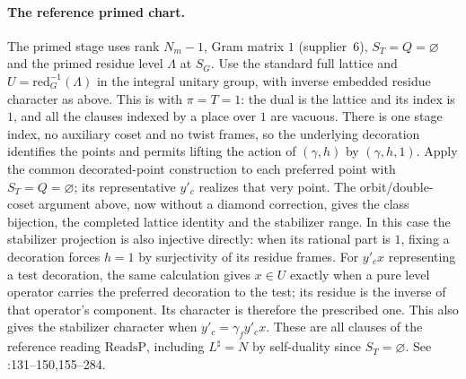 \paragraph{The reference primed chart.}
The primed stage uses rank $N_m-1$, Gram matrix $1$ (supplier~6),
$S_T=Q=\varnothing$ and the primed residue level $\Lambda$ at $S_G$.
Use the standard full lattice and $U=\mathrm{red}_G^{-1}(\Lambda)$ in
the integral unitary group, with inverse embedded residue character as
above. This is  with $\pi=T=1$: the dual is the lattice
and its index is $1$, and all the clauses indexed by a place over $1$
are vacuous. There is one stage index, no auxiliary coset and no twist
frames, so the underlying decoration identifies the points and permits
lifting the action of $(\gamma,h)$ by $(\gamma,h,1)$. Apply the common
decorated-point construction to each preferred point with $S_T=Q=\varnothing$;
its representative $y'_c$ realizes that very point. The orbit/double-coset
argument above, now without a diamond correction, gives the class bijection,
the completed lattice identity and the stabilizer range. In this case
the stabilizer projection is also injective directly: when its rational
part is $1$, fixing a decoration forces $h=1$ by surjectivity of its
residue frames. For $y'_c x$ representing a test decoration, the same
calculation gives $x\in U$ exactly when a pure level operator carries
the preferred decoration to the test; its residue is the inverse of that
operator's component. Its character is therefore the prescribed one.
This also gives the stabilizer character when $y'_c=\gamma_f y'_c x$.
These are all clauses of the reference reading $\mathrm{ReadsP}$,
including $L^\sharp=N$ by self-duality since $S_T=\varnothing$.
See :131--150,155--284.

